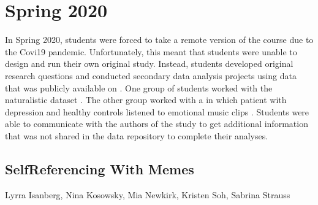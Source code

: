 \documentclass[letterpaper,10pt,english]{sphinxmanual}
\begin{document}
\section{Spring 2020}
\label{\detokenize{content/2020_Spring:spring-2020}}\label{\detokenize{content/2020_Spring::doc}}
In Spring 2020, students were forced to take a remote version of the course due to the Covi19 pandemic. Unfortunately, this meant that students were unable to design and run their own original study. Instead, students developed original research questions and conducted secondary data analysis projects using data that was publicly available on . One group of students worked with the naturalistic  dataset . The other group worked with a  in which patient with depression and healthy controls listened to emotional music clips . Students were able to communicate with the authors of the study to get additional information that was not shared in the data repository to complete their analyses.


\subsection{Self\sphinxhyphen{}Referencing With Memes}
\label{\detokenize{content/2020_Spring:self-referencing-with-memes}}
Lyrra Isanberg, Nina Kosowsky, Mia Newkirk, Kristen Soh, Sabrina Strauss
\end{document}

